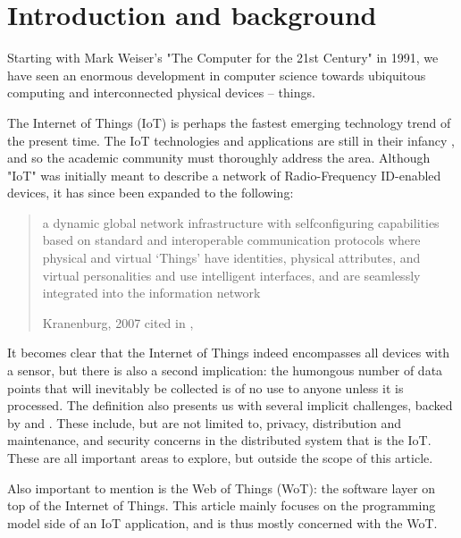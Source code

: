 \section{Introduction and background}
Starting with \nocite{weiser:the-computer-for-the-21st-century:1991}Mark Weiser's "The Computer for the 21st Century" in 1991, we have seen an enormous development in computer science towards ubiquitous computing and interconnected physical devices -- things.

The Internet of Things (IoT) is perhaps the fastest emerging technology trend of the present time. The IoT technologies and applications are still in their infancy \autocite{xu-he-li:internet-of-things-in-industries-a-survey:2014}, and so the academic community must thoroughly address the area. Although "IoT" was initially meant to describe a network of Radio-Frequency ID-enabled devices, it has since been expanded to the following:

\blockquote[{Kranenburg, 2007 cited in \citeauthor{xu-he-li:internet-of-things-in-industries-a-survey:2014}, \citeyear[1]{xu-he-li:internet-of-things-in-industries-a-survey:2014}}]{a dynamic global network infrastructure with selfconfiguring capabilities based on standard and interoperable communication protocols where physical and virtual ‘Things’ have identities, physical attributes, and virtual personalities and use intelligent interfaces, and are seamlessly integrated into the information network}.

It becomes clear that the Internet of Things indeed encompasses all devices with a sensor, but there is also a second implication: the humongous number of data points that will inevitably be collected is of no use to anyone unless it is processed. The definition also presents us with several implicit challenges, backed by \textcite{xu-he-li:internet-of-things-in-industries-a-survey:2014} and \textcite{palattella-accettura-vilajosana-watteyne-gieco-boggia-dohler:standardized-protocol-stack-for-the-internet-of-important-things:2012}. These include, but are not limited to, privacy, distribution and maintenance, and security concerns in the distributed system that is the IoT. These are all important areas to explore, but outside the scope of this article.

Also important to mention is the Web of Things (WoT): the software layer on top of the Internet of Things. This article mainly focuses on the programming model side of an IoT application, and is thus mostly concerned with the WoT.

